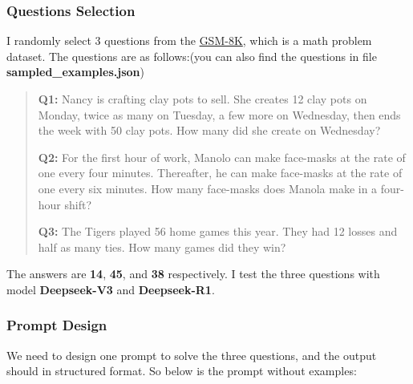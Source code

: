 \documentclass[a4paper,12pt]{article}
\begin{document}
\subsubsection{Questions Selection}

I randomly select 3 questions from the \href{https://huggingface.co/datasets/openai/gsm8k}{GSM-8K}, which is a math problem dataset. The questions are as follows:(you can also find the questions in file \textbf{sampled\_examples.json})
\begin{quote}
    \textbf{Q1:} Nancy is crafting clay pots to sell. She creates 12 clay pots on Monday, twice as many on Tuesday, a few more on Wednesday, then ends the week with 50 clay pots. How many did she create on Wednesday?
    
    \textbf{Q2:} For the first hour of work, Manolo can make face-masks at the rate of one every four minutes. Thereafter, he can make face-masks at the rate of one every six minutes. How many face-masks does Manola make in a four-hour shift?
    
    \textbf{Q3:} The Tigers played 56 home games this year. They had 12 losses and half as many ties. How many games did they win?
\end{quote}

The answers are \textbf{14}, \textbf{45}, and \textbf{38} respectively. I test the three questions with model \textbf{Deepseek-V3} and \textbf{Deepseek-R1}.

\subsubsection{Prompt Design}

We need to design one prompt to solve the three questions, and the output should in structured format. So below is the prompt without examples:
\end{document}
